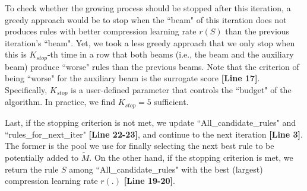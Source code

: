 To check whether the growing process should be stopped after this iteration, a greedy approach would be to stop when the ``beam" of this iteration does not produces rules with better compression learning rate $r(S)$ than the previous iteration's ``beam". Yet, we took a less greedy approach that we only stop when this is $K_{stop}$-th time in a row that both beams (i.e., the beam and the auxiliary beam) produce ``worse" rules than the previous beams. Note that the criterion of being ``worse" for the auxiliary beam is the surrogate score \textbf{[Line 17]}. Specifically, $K_{stop}$ is a user-defined parameter that controls the ``budget" of the algorithm. In practice, we find $K_{stop} = 5$ sufficient. 

Last, if the stopping criterion is not met, we update ``All\_candidate\_rules" and \\
``rules\_for\_next\_iter" \textbf{[Line 22-23]}, and continue to the next iteration \textbf{[Line 3]}. The former is the pool we use for finally selecting the next best rule to be potentially added to $\tilde{M}$. On the other hand, if the stopping criterion is met, we return the rule $S$ among ``All\_candidate\_rules" with the best (largest) compression learning rate $r(.)$ \textbf{[Line 19-20]}. 






